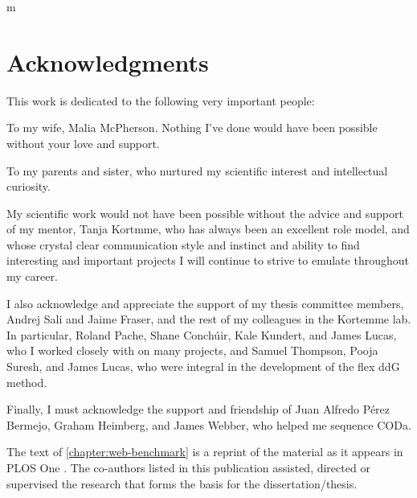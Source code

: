 m\chapter*{Acknowledgments}

This work is dedicated to the following very important people:

To my wife, Malia McPherson. Nothing I've done would have been possible without your love and support.

To my parents and sister, who nurtured my scientific interest and intellectual curiosity.

My scientific work would not have been possible without the advice and support of my mentor, Tanja Kortmme, who has always been an excellent role model, and whose crystal clear communication style and instinct and ability to find interesting and important projects I will continue to strive to emulate throughout my career.

I also acknowledge and appreciate the support of my thesis committee members, Andrej Sali and Jaime Fraser, and the rest of my colleagues in the Kortemme lab.
In particular, Roland Pache, Shane Conch{\'u}ir, Kale Kundert, and James Lucas, who I worked closely with on many projects, and Samuel Thompson, Pooja Suresh, and James Lucas, who were integral in the development of the flex ddG method.

Finally, I must acknowledge the support and friendship of Juan Alfredo Pérez Bermejo, Graham Heimberg, and James Webber, who helped me sequence CODa.

The text of \ref{chapter:web-benchmark} is a reprint of the material as it appears in PLOS One \citet{conchuir_web_2015}. The co-authors listed in this publication assisted, directed or supervised the research that forms the basis for the dissertation/thesis.
